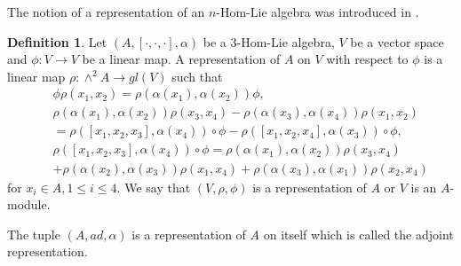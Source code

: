 \documentclass[a4paper,11pt]{article}
\def\a{\alpha}
\newtheorem{pro}[thm]{Proposition}
\newtheorem{ex}[thm]{Example}
\theoremstyle{definition}
\newtheorem{defi}{Definition}[section]
\begin{document}
%
The notion of a representation of an $n$-Hom-Lie algebra was introduced in \cite{Ammar&mabrouk&makhlouf}.
\begin{defi}\label{defi:rep}
 Let $(A,[\cdot,\cdot,\cdot],\alpha)$ be a $3$-Hom-Lie algebra, $V$ be a vector space and $\phi:V\to V$ be a linear map. A representation of $A$ on $V$ with respect to $\phi$ is a  linear map $\rho: \wedge^2A\rightarrow gl(V)$ such that
\begin{eqnarray}
&&\phi\rho(x_1,x_2)=\rho(\alpha(x_1),\a(x_2))\phi,\\
&&\nonumber\rho (\alpha(x_1),\alpha(x_2))\rho(x_3,x_4)-\rho(\alpha(x_3),\alpha(x_4))\rho(x_1,x_2)\\
 &&\label{Rep3HomLie1}  =\rho([x_1,x_2,x_3],\alpha(x_4))\circ\phi-\rho([x_1,x_2,x_4],\alpha(x_3))\circ\phi,\\
&&\nonumber\rho ([x_1,x_2,x_3],\alpha(x_4))\circ\phi=\rho(\alpha(x_1),\alpha(x_2))\rho(x_3,x_4)\\
&&\label{Rep3HomLie2} +\rho(\alpha(x_2),\alpha(x_3))\rho(x_1,x_4)+\rho(\alpha(x_3),\alpha(x_1))\rho(x_2,x_4)
\end{eqnarray}
for $x_i\in A, 1\leq i\leq 4$. We say that $(V,\rho,\phi)$ is a representation of $A$ or $V$ is an $A$-module.
\end{defi}
The tuple $(A,ad,\a)$ is a representation of $A$ on itself which is called the adjoint  representation.
\end{document}
